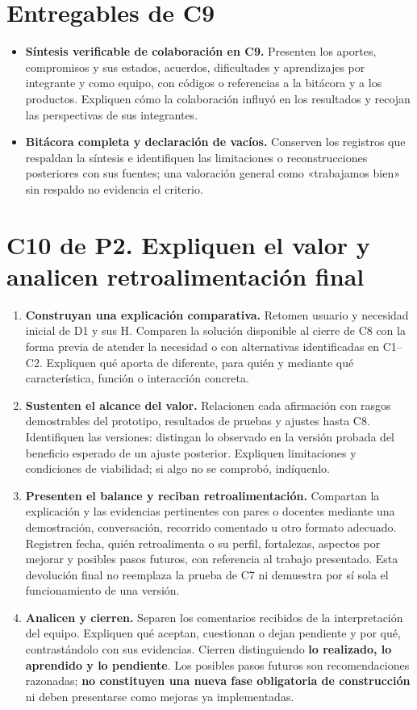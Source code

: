 \section*{Entregables de C9}
\begin{itemize}
\item \textbf{Síntesis verificable de colaboración en C9.} Presenten los aportes, compromisos y sus estados, acuerdos, dificultades y aprendizajes por integrante y como equipo, con códigos o referencias a la bitácora y a los productos. Expliquen cómo la colaboración influyó en los resultados y recojan las perspectivas de sus integrantes.
\item \textbf{Bitácora completa y declaración de vacíos.} Conserven los registros que respaldan la síntesis e identifiquen las limitaciones o reconstrucciones posteriores con sus fuentes; una valoración general como «trabajamos bien» sin respaldo no evidencia el criterio.
\end{itemize}

\newpage
\section*{C10 de P2. Expliquen el valor y analicen retroalimentación final}
\begin{enumerate}[resume=pasos]
\item \textbf{Construyan una explicación comparativa.} Retomen usuario y necesidad inicial de D1 y sus H. Comparen la solución disponible al cierre de C8 con la forma previa de atender la necesidad o con alternativas identificadas en C1--C2. Expliquen qué aporta de diferente, para quién y mediante qué característica, función o interacción concreta.
\item \textbf{Sustenten el alcance del valor.} Relacionen cada afirmación con rasgos demostrables del prototipo, resultados de pruebas y ajustes hasta C8. Identifiquen las versiones: distingan lo observado en la versión probada del beneficio esperado de un ajuste posterior. Expliquen limitaciones y condiciones de viabilidad; si algo no se comprobó, indíquenlo.
\item \textbf{Presenten el balance y reciban retroalimentación.} Compartan la explicación y las evidencias pertinentes con pares o docentes mediante una demostración, conversación, recorrido comentado u otro formato adecuado. Registren fecha, quién retroalimenta o su perfil, fortalezas, aspectos por mejorar y posibles pasos futuros, con referencia al trabajo presentado. Esta devolución final no reemplaza la prueba de C7 ni demuestra por sí sola el funcionamiento de una versión.
\item \textbf{Analicen y cierren.} Separen los comentarios recibidos de la interpretación del equipo. Expliquen qué aceptan, cuestionan o dejan pendiente y por qué, contrastándolo con sus evidencias. Cierren distinguiendo \textbf{lo realizado, lo aprendido y lo pendiente}. Los posibles pasos futuros son recomendaciones razonadas; \textbf{no constituyen una nueva fase obligatoria de construcción} ni deben presentarse como mejoras ya implementadas.
\end{enumerate}

